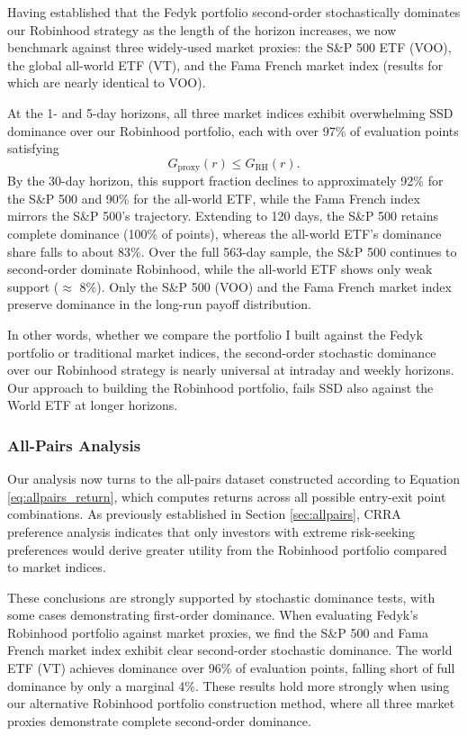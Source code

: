 Having established that the Fedyk portfolio second-order stochastically dominates our Robinhood strategy as the length of the horizon increases, 
we now benchmark against three widely-used market proxies: the S\&P 500 ETF (VOO), the global all-world ETF (VT), and the Fama French market index (results for which are nearly identical to VOO).

At the 1- and 5-day horizons, all three market indices exhibit overwhelming SSD dominance over our Robinhood portfolio, each with over 97\% of evaluation points satisfying
\[
G_{\mathrm{proxy}}(r) \leq G_{\mathrm{RH}}(r).
\]
By the 30-day horizon, this support fraction declines to approximately 92\% for the S\&P 500 and 90\% for the all-world ETF, while the Fama French index mirrors the S\&P 500's trajectory. 
Extending to 120 days, the S\&P 500 retains complete dominance (100\% of points), whereas the all-world ETF's dominance share falls to about 83\%. 
Over the full 563-day sample, the S\&P 500 continues to second-order dominate Robinhood, while the all-world ETF shows only weak support ($\approx$ 8\%).
Only the S\&P 500 (VOO) and the Fama French market index preserve dominance in the long-run payoff distribution.

In other words, whether we compare the portfolio I built against the Fedyk portfolio or traditional market indices, the second-order stochastic dominance over our Robinhood strategy is nearly universal at intraday and weekly horizons. 
Our approach to building the Robinhood portfolio, fails SSD also against the World ETF at longer horizons.

\subsubsection{All-Pairs Analysis}
Our analysis now turns to the all-pairs dataset constructed according to Equation \ref{eq:allpairs_return}, which computes returns across all possible entry-exit point combinations. 
As previously established in Section \ref{sec:allpairs}, CRRA preference analysis indicates that only investors with extreme risk-seeking preferences would derive greater utility from the Robinhood portfolio compared to market indices.

These conclusions are strongly supported by stochastic dominance tests, with some cases demonstrating first-order dominance. 
When evaluating Fedyk's Robinhood portfolio against market proxies, we find the S\&P 500 and Fama French market index exhibit clear second-order stochastic dominance. 
The world ETF (VT) achieves dominance over 96\% of evaluation points, falling short of full dominance by only a marginal 4\%. 
These results hold more strongly when using our alternative Robinhood portfolio construction method, where all three market proxies demonstrate complete second-order dominance.

